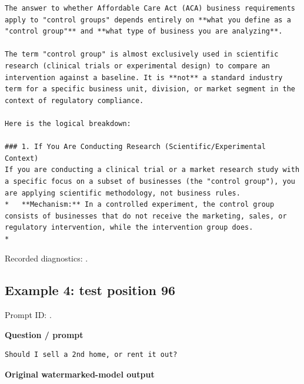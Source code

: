 \begin{Verbatim}
The answer to whether Affordable Care Act (ACA) business requirements apply to "control groups" depends entirely on **what you define as a "control group"** and **what type of business you are analyzing**.

The term "control group" is almost exclusively used in scientific research (clinical trials or experimental design) to compare an intervention against a baseline. It is **not** a standard industry term for a specific business unit, division, or market segment in the context of regulatory compliance.

Here is the logical breakdown:

### 1. If You Are Conducting Research (Scientific/Experimental Context)
If you are conducting a clinical trial or a market research study with a specific focus on a subset of businesses (the "control group"), you are applying scientific methodology, not business rules.
*   **Mechanism:** In a controlled experiment, the control group consists of businesses that do not receive the marketing, sales, or regulatory intervention, while the intervention group does.
*  
\end{Verbatim}

Recorded diagnostics:
\texttt{}.

\subsection{Example 4: test position
96}\label{record-docs-watermarking-qualitative-text-textseal2-smoothing-md-example-4-test-position-96}

Prompt ID:
\texttt{}.

\textbf{Question / prompt}

\begin{Verbatim}
Should I sell a 2nd home, or rent it out?
\end{Verbatim}

\textbf{Original watermarked-model output}

